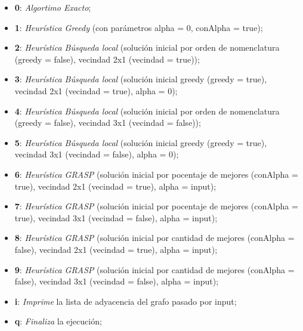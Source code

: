 \documentclass[a4paper]{article}
\begin{document}
\begin{itemize}
\item \textbf{0}: \emph{Algortimo Exacto};
\item \textbf{1}: \emph{Heur\'istica Greedy} (con par\'ametros alpha = 0, conAlpha = true);
\item \textbf{2}: \emph{Heur\'istica B\'usqueda local} (soluci\'on inicial por orden de nomenclatura (greedy = false), vecindad 2x1 (vecindad = true));
\item \textbf{3}: \emph{Heur\'istica B\'usqueda local} (soluci\'on inicial greedy (greedy = true), vecindad 2x1 (vecindad = true), alpha = 0);
\item \textbf{4}: \emph{Heur\'istica B\'usqueda local} (soluci\'on inicial por orden de nomenclatura (greedy = false), vecindad 3x1 (vecindad = false));
\item \textbf{5}: \emph{Heur\'istica B\'usqueda local} (soluci\'on inicial greedy (greedy = true), vecindad 3x1 (vecindad = false), alpha = 0);
\item \textbf{6}: \emph{Heur\'istica GRASP} (soluci\'on inicial por pocentaje de mejores (conAlpha = true), vecindad 2x1 (vecindad = true), alpha = input);
\item \textbf{7}:\emph{ Heur\'istica GRASP} (soluci\'on inicial por pocentaje de mejores (conAlpha = true), vecindad 3x1 (vecindad = false), alpha = input);
\item \textbf{8}:\emph{ Heur\'istica GRASP }(soluci\'on inicial por cantidad de mejores (conAlpha = false), vecindad 2x1 (vecindad = true), alpha = input);
\item \textbf{9}: \emph{Heur\'istica GRASP} (soluci\'on inicial por cantidad de mejores (conAlpha = false), vecindad 3x1 (vecindad = false), alpha = input);
\item \textbf{i}: \emph{Imprime} la lista de adyacencia del grafo pasado por input;
\item \textbf{q}: \emph{Finaliza} la ejecuci\'on;
\end{itemize}





\end{document}
